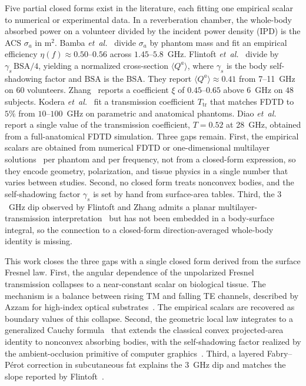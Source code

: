 \documentclass[journal,twocolumn,10pt]{IEEEtran}
\theoremstyle{plain}
\theoremstyle{remark}
\begin{document}
Five partial closed forms exist in the literature, each fitting one
empirical scalar to numerical or experimental data. In a reverberation
chamber, the whole-body absorbed power on a volunteer divided by the
incident power density (\gls{IPD}) is the \gls{ACS} $\sigma_a$ in m$^2$.
Bamba \textit{et~al.}~\cite{Bamba2014} divide $\sigma_a$ by phantom
mass and fit an empirical efficiency $\eta(f) \approx 0.50$--$0.56$
across $1.45$--$5.8$~GHz.
Flintoft \textit{et~al.}~\cite{Flintoft2014} divide
by $\gamma_s\,\mathrm{BSA}/4$, yielding a normalized cross-section
$\langle Q^a \rangle$, where $\gamma_s$ is the body self-shadowing
factor and $\mathrm{BSA}$ is the \gls{BSA}. They report
$\langle Q^a \rangle \approx 0.41$ from 7--11~GHz on $60$ volunteers.
Zhang~\cite{Zhang2017thesis,ZhangRobinson2020} reports a coefficient
$\xi$ of $0.45$--$0.65$ above 6~GHz on $48$ subjects. Kodera
\textit{et~al.}~\cite{Kodera2024} fit a transmission coefficient
$T_{\mathrm{tr}}$ that matches FDTD to $5\%$ from $10$--$100$~GHz on
parametric and anatomical phantoms. Diao \textit{et~al.}~\cite{Diao2024}
report a single value of the transmission coefficient,
$T = 0.52$ at 28~GHz, obtained from a full-anatomical FDTD
simulation. Three gaps remain.
First, the empirical scalars are obtained from numerical FDTD
or one-dimensional multilayer
solutions~\cite{Kodera2024,Bamba2014} per phantom and per frequency,
not from a closed-form expression, so they encode geometry,
polarization, and tissue physics in a single number that varies
between studies. Second, no closed form treats
nonconvex bodies, and the self-shadowing factor $\gamma_s$ is set by
hand from surface-area tables. Third, the $3$~GHz dip observed by
Flintoft and Zhang admits a planar multilayer-transmission
interpretation~\cite{Zhang2017thesis} but has not been embedded in a
body-surface integral, so the connection to a closed-form
direction-averaged whole-body identity is missing.

This work closes the three gaps with a single closed form derived
from the surface Fresnel law. First, the angular dependence of the
unpolarized Fresnel transmission collapses to a near-constant scalar
on biological tissue. The mechanism is a balance between rising
\gls{TM} and falling \gls{TE} channels, described by Azzam for
high-index optical substrates~\cite{Azzam2015}. The empirical
scalars are recovered as boundary values of this collapse. Second,
the geometric local law integrates to a generalized Cauchy
formula~\cite{Cauchy1841} that extends the classical convex
projected-area identity to nonconvex absorbing bodies, with the
self-shadowing factor realized by the ambient-occlusion primitive of
computer graphics~\cite{Zhukov1998,Landis2002,AkenineMoller2018}.
Third, a layered Fabry--P\'erot correction in subcutaneous fat
explains the $3$~GHz dip and matches the slope reported by
Flintoft~\cite{Flintoft2014}.
\end{document}
